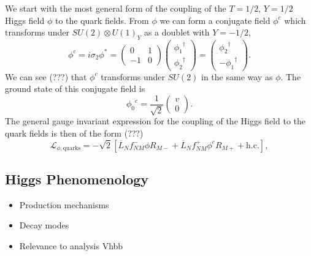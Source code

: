 We start with the most general form of the coupling of the $T = 1/2$, $Y=1/2$ Higgs field $\phi$ to the quark fields. From $\phi$ we can form a conjugate field $\phi^c$ which transforms under $SU(2) \otimes U(1)_Y$ as a doublet with $Y = -1/2$,
%
\begin{equation}\label{phi c field definition}
    \phi^c = i \sigma_2 \phi^* = 
    \begin{pmatrix}
    0 & 1 \\ -1 & 0
    \end{pmatrix} 
    \begin{pmatrix}
    {\phi_1}^\dagger \\ {\phi_2}^\dagger
    \end{pmatrix} = \begin{pmatrix}
    {\phi_2}^\dagger \\ -{\phi_1}^\dagger
    \end{pmatrix} .
\end{equation}
%
We can see (???) that $\phi^c$ transforms under $SU(2)$ in the same way as $\phi$. The ground state of this conjugate field is 
%
\begin{equation}
    {\phi_0}^c = \frac{1}{\sqrt{2}} \begin{pmatrix} v \\ 0 \end{pmatrix} .
\end{equation}
%
The general gauge invariant expression for the coupling of the Higgs field to the quark fields is then of the form (???)
%
\begin{equation}\label{quark mass term}
    \mathcal{L}_{\phi, \text{quarks}} = - \sqrt{2} \left[ \overline{L}_N f^-_{NM} \phi R_{M-} +
    \overline{L}_N f^+_{NM} \phi^c R_{M+} + \text{h.c.}
    \right] ,
\end{equation}
%


\subsection{Higgs Phenomenology}

\begin{itemize}
  \item Production mechanisms
  \item Decay modes
  \item Relevance to analysis Vhbb
\end{itemize}



